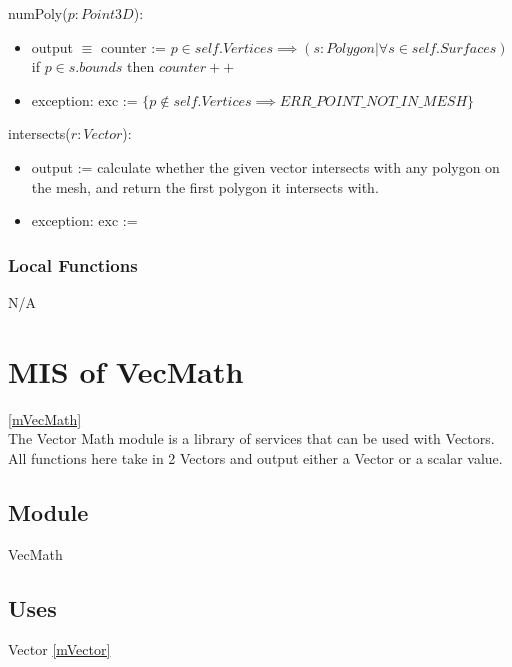\documentclass[12pt, titlepage]{article}
\begin{document}
\noindent numPoly($p:Point3D$):
\begin{itemize}
	\item output $\equiv$ counter := $p \in self.Vertices \implies (s:Polygon| 
	\forall s \in self.Surfaces)$ if $p \in s.bounds$ then $counter++$ \\
	\item exception: exc := $\{p \notin self.Vertices \implies 
	ERR\_POINT\_NOT\_IN\_MESH\}$\\
\end{itemize}

\noindent intersects($r:Vector$):
\begin{itemize}
	\item output := calculate whether the given vector intersects with any 
	polygon on the mesh, and return the first polygon it intersects with.\\
	\item exception: exc := \\
\end{itemize}

\subsubsection{Local Functions}
N/A

\newpage



\section{MIS of VecMath} \ref{mVecMath} \\
The Vector Math module is a library of services that can be used with Vectors. 
All functions here take in 2 Vectors and output either a Vector or a scalar 
value.

\subsection{Module}
VecMath

\subsection{Uses}
Vector \ref{mVector}\\
\end{document}
